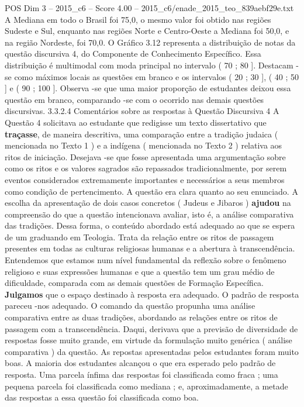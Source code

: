 \begin{textsample}{POS Dim 3 – 2015\_c6 – Score 4.00 – 2015\_c6/enade\_2015\_teo\_839aebf29e.txt}
A Mediana em todo o Brasil foi 75,0, o mesmo valor foi obtido nas regiões Sudeste e Sul, enquanto nas regiões Norte e Centro-Oeste a Mediana foi 50,0, e na região Nordeste, foi 70,0.
O Gráfico 3.12 representa a distribuição de notas da questão discursiva 4, do Componente de Conhecimento Específico.
Essa distribuição é multimodal com moda principal no intervalo ( 70 ; 80 ].
Destacam -se como máximos locais as questões em branco e os intervalos ( 20 ; 30 ], ( 40 ; 50 ] e ( 90 ; 100 ].
Observa -se que uma maior proporção de estudantes deixou essa questão em branco, comparando -se com o ocorrido nas demais questões discursivas. 3.3.2.4 Comentários sobre as respostas à Questão Discursiva 4 A Questão 4 solicitava ao estudante que redigisse um texto dissertativo que \textbf{traçasse}, de maneira descritiva, uma comparação entre a tradição judaica ( mencionada no Texto 1 ) e a indígena ( mencionada no Texto 2 ) relativa aos ritos de iniciação.
Desejava -se que fosse apresentada uma argumentação sobre como os ritos e os valores sagrados são repassados tradicionalmente, por serem eventos considerados extremamente importantes e necessários a seus membros como condição de pertencimento.
A questão era clara quanto ao seu enunciado.
A escolha da apresentação de dois casos concretos ( Judeus e Jibaros ) \textbf{ajudou} na compreensão do que a questão intencionava avaliar, isto é, a análise comparativa das tradições.
Dessa forma, o conteúdo abordado está adequado ao que se espera de um graduando em Teologia.
Trata da relação entre os ritos de passagem presentes em todas as culturas religiosas humanas e a abertura à transcendência.
Entendemos que estamos num nível fundamental da reflexão sobre o fenômeno religioso e suas expressões humanas e que a questão tem um grau médio de dificuldade, comparada com as demais questões de Formação Específica. \textbf{Julgamos} que o espaço destinado à resposta era adequado.
O padrão de resposta pareceu -nos adequado.
O comando da questão propunha uma análise comparativa entre as duas tradições, abordando as relações entre os ritos de passagem com a transcendência.
Daqui, derivava que a previsão de diversidade de respostas fosse muito grande, em virtude da formulação muito genérica ( análise comparativa ) da questão.
As repostas apresentadas pelos estudantes foram muito boas.
A maioria dos estudantes alcançou o que era esperado pelo padrão de resposta.
Uma parcela ínfima das respostas foi classificada como fraca ; uma pequena parcela foi classificada como mediana ; e, aproximadamente, a metade das respostas a essa questão foi classificada como boa.

\end{textsample}
